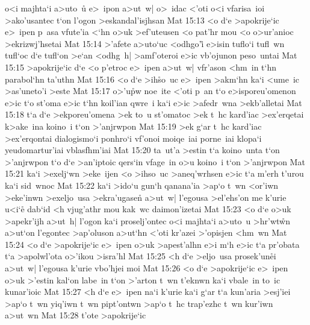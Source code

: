 o<i
majhta`i
a>uto~u\r{}
e>~ipon
a>ut~w|
o>~idac
<'oti
o<i
vfarisa~ioi
>ako'usantec
t`on
l'ogon
>eskandal'isjhsan\bibvsend
\vs Mat 15:13
<o
d`e
>apokrije`ic
e>~ipen
p~asa
vfute'ia
<`hn
o>uk
>ef'uteusen
<o
pat'hr
mou
<o
o>ur'anioc
>ekrizwj'hsetai\bibvsend
\vs Mat 15:14
>'afete
a>uto`uc
<odhgo'i\r{}
e>isin
tuflo`i
tufl~wn
tufl`oc
d`e
tufl`on
>e`an
<odhg~h|
>amf'oteroi
e>ic
vb'ojunon
peso~untai\bibvsend
\vs Mat 15:15
>apokrije`ic
d`e
<o
p'etroc
e>~ipen
a>ut~w|
vfr'ason
<hm~in
t`hn
parabol`hn
ta'uthn\bibvsend
\vs Mat 15:16
<o
d`e
>ih\r{s}o~uc
e>~ipen
>akm`hn
ka`i
<ume~ic
>as'uneto'i
>este\bibvsend
\vs Mat 15:17
o>'u\r{p}w
noe~ite
<'oti
p~an
t`o
e>isporeu'omenon
e>ic
t`o
st'oma
e>ic
t`hn
koil'ian
qwre~i
ka`i
e>ic
>afedr~wna
>ekb'alletai\bibvsend
\vs Mat 15:18
t`a
d`e
>ekporeu'omena
>ek
to~u
st'omatoc
>ek
t~hc
kard'iac
>ex'erqetai
k>ake~ina
koino~i
t`on
>'anjrwpon\bibvsend
\vs Mat 15:19
>ek
g`ar
t~hc
kard'iac
>ex'erqontai
dialogismo`i
ponhro`i
vf'onoi
moiqe~iai
porne~iai
klopa`i
yeudomartur'iai
vblasfhm'iai\bibvsend
\vs Mat 15:20
ta~ut'a
>estin
t`a
koino~unta
t`on
>'anjrwpon
t`o
d`e
>an'iptoic
qers`in
vfage~in
o>u
koino~i
t`on
>'anjrwpon\bibvsend
\vs Mat 15:21
ka`i
>exelj`wn
>eke~ijen
<o
>ihso~uc
>aneq'wrhsen
e>ic
t`a
m'erh
t'urou
ka`i
sid~wnoc\bibvsend
\vs Mat 15:22
ka`i
>ido`u
gun`h
qanana'ia
>ap`o
t~wn
<or'iwn
>eke'inwn
>exeljo~usa
>ekra'ugasen\r{}
a>ut~w|
l'egousa
>el'ehs'on
me
k'urie
u<i`e\r{}
dab`id
<h
vjug'athr
mou
kak~wc
daimon'izetai\bibvsend
\vs Mat 15:23
<o
d`e
o>uk
>apekr'ijh
a>ut~h|
l'ogon
ka`i
proselj'ontec
o<i
majhta`i
a>uto~u
>hr'wt\r{w}n
a>ut`on
l'egontec
>ap'oluson
a>ut`hn
<'oti
kr'azei
>'opisjen
<hm~wn\bibvsend
\vs Mat 15:24
<o
d`e
>apokrije`ic
e>~ipen
o>uk
>apest'alhn
e>i
m`h
e>ic
t`a
pr'obata
t`a
>apolwl'ota
o>'ikou
>isra'hl\bibvsend
\vs Mat 15:25
<h
d`e
>eljo~usa
prosek'un\r{e}i
a>ut~w|
l'egousa
k'urie
vbo'hjei
moi\bibvsend
\vs Mat 15:26
<o
d`e
>apokrije`ic
e>~ipen
o>uk
>'estin
kal`on
labe~in
t`on
>'arton
t~wn
t'eknwn
ka`i
vbale~in
to~ic
kunar'ioic\bibvsend
\vs Mat 15:27
<h
d`e
e>~ipen
na`i
k'urie
ka`i
g`ar
t`a
kun'aria
>esj'iei
>ap`o
t~wn
yiq'iwn
t~wn
pipt'ontwn
>ap`o
t~hc
trap'ezhc
t~wn
kur'iwn
a>ut~wn\bibvsend
\vs Mat 15:28
t'ote
>apokrije`ic
